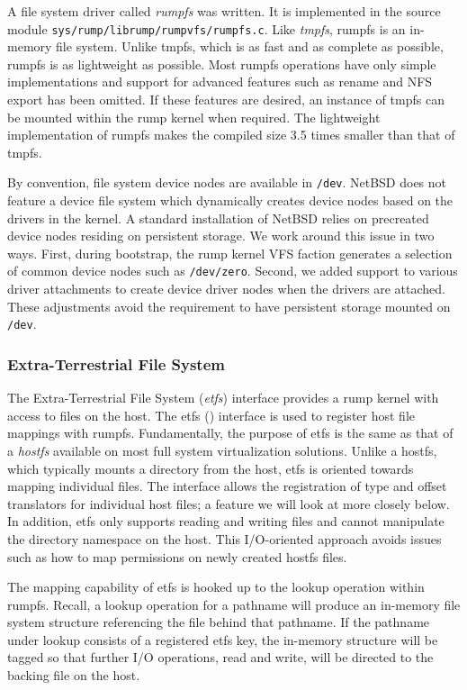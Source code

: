A file system driver called \textit{rumpfs}
was written.  It is implemented in the source module
\verb+sys/rump/librump/rumpvfs/rumpfs.c+.  Like \textit{tmpfs},
rumpfs is an in-memory file system.  Unlike tmpfs, which is as fast
and as complete as possible, rumpfs is as lightweight as possible.
Most rumpfs operations have only simple implementations and support
for advanced features such as rename and NFS export has been omitted.
If these features are desired, an instance of tmpfs can be mounted
within the rump kernel when required.  The lightweight implementation
of rumpfs makes the compiled size 3.5 times smaller than that of
tmpfs.

By convention, file system device nodes are available in \texttt{/dev}.
NetBSD does not feature a device file system which dynamically
creates device nodes based on the drivers in the kernel.
A standard installation of NetBSD relies on precreated
device nodes residing on persistent storage.  We work around this
issue in two ways.  First, during bootstrap, the rump kernel VFS
faction generates a selection of common device nodes such as
\texttt{/dev/zero}.  Second, we added support to various driver
attachments to create device driver nodes when the drivers are
attached.  These adjustments avoid the requirement to have persistent
storage mounted on \texttt{/dev}.

\subsubsection{Extra-Terrestrial File System}
\label{sect:etfs}

The Extra-Terrestrial File System (\textit{etfs}) interface provides
a rump kernel with access to files on the host.  The
etfs () interface is used
to register host file mappings with rumpfs.  Fundamentally, the
purpose of etfs is the same as that of a \textit{hostfs} available
on most full system virtualization solutions.  Unlike a hostfs,
which typically mounts a directory from the host, etfs is oriented
towards mapping individual files.  The interface allows the
registration of type and offset translators for individual host
files; a feature we will look at more closely below.  In addition,
etfs only supports reading and writing files and cannot manipulate
the directory namespace on the host.  This I/O-oriented approach
avoids issues such as how to map permissions on newly created hostfs
files.

The mapping capability of etfs is hooked up to the lookup operation
within rumpfs.  Recall, a lookup operation for a pathname will
produce an in-memory file system structure referencing the file
behind that pathname.  If the pathname under lookup consists of a
registered etfs key, the in-memory structure will be tagged so that
further I/O operations, \ie read and write, will be directed to
the backing file on the host.

